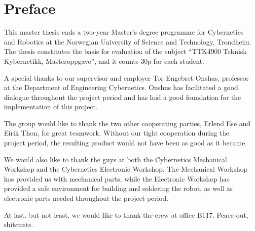 \chapter*{Preface}

This master thesis ends a two-year Master's degree programme for Cybernetics and Robotics at the Norwegian University of Science and Technology, Trondheim. The thesis constitutes the basis for evaluation of the subject ``TTK4900 Teknisk Kybernetikk, Masteroppgave'', and it counts 30p for each student.

A special thanks to our supervisor and employer Tor Engebret Onshus, professor at the Department of Engineering Cybernetics. Onshus has facilitated a good dialogue throughout the project period and has laid a good foundation for the implementation of this project.

The group would like to thank the two other cooperating parties, Erlend Ese and Eirik Thon, for great teamwork. Without our tight cooperation during the project period, the resulting product would not have been as good as it became.

We would also like to thank the guys at both the Cybernetics Mechanical Workshop and the Cybernetics Electronic Workshop. The Mechanical Workshop has provided us with mechanical parts, while the Electronic Workshop has provided a safe environment for building and soldering the robot, as well as electronic parts needed throughout the project period.

At last, but not least, we would like to thank the crew at office B117. Peace out, shitcunts. 